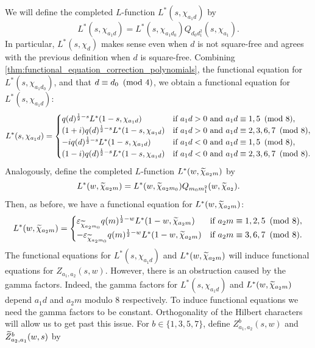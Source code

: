 \documentclass[12pt,reqno,oneside]{amsart}
\begin{document}
    We will define the completed $L$-function $L^{\ast}(s,\chi_{a_{1}d})$ by
    \[
        L^{\ast}(s,\chi_{a_{1}d}) = L^{\ast}(s,\chi_{a_{1}d_{0}})Q_{d_{0}d_{1}^{2}}(s,\chi_{a_{1}}).
    \]
    In particular, $L^{\ast}(s,\chi_{d})$ makes sense even when $d$ is not square-free and agrees with the previous definition when $d$ is square-free. 
    Combining \cref{thm:functional_equation_correction_polynomials}, the functional equation for $L^{\ast}(s,\chi_{a_{1}d_{0}})$, and that $d \equiv d_{0} \ \left(\text{mod }4\right)$, we obtain a functional equation for $L^{\ast}(s,\chi_{a_{1}d})$:
    \[
        L^{\ast}(s,\chi_{a_{1}d}) = \begin{cases} q(d)^{\frac{1}{2}-s}L^{\ast}(1-s,\chi_{a_{1}d}) & \text{if $a_{1}d > 0$ and $a_{1}d \equiv 1,5 \ \left(\text{mod }8\right)$}, \\ (1+i)q(d)^{\frac{1}{2}-s}L^{\ast}(1-s,\chi_{a_{1}d}) & \text{if $a_{1}d > 0$ and $a_{1}d \equiv 2,3,6,7 \ \left(\text{mod }8\right)$}, \\ -iq(d)^{\frac{1}{2}-s}L^{\ast}(1-s,\chi_{a_{1}d}) & \text{if $a_{1}d < 0$ and $a_{1}d \equiv 1,5 \ \left(\text{mod }8\right)$}, \\ (1-i)q(d)^{\frac{1}{2}-s}L^{\ast}(1-s,\chi_{a_{1}d}) & \text{if $a_{1}d < 0$ and $a_{1}d \equiv 2,3,6,7 \ \left(\text{mod }8\right)$}. \end{cases}
    \]
    Analogously, define the completed $L$-function $L^{\ast}(w,\widetilde{\chi}_{a_{2}m})$ by
    \[
        L^{\ast}(w,\widetilde{\chi}_{a_{2}m}) = L^{\ast}(w,\widetilde{\chi}_{a_{2}m_{0}})Q_{m_{0}m_{1}^{2}}(w,\widetilde{\chi}_{a_{2}}).
    \]
    Then, as before, we have a functional equation for $L^{\ast}(w,\widetilde{\chi}_{a_{2}m})$:
    \[
        L^{\ast}(w,\widetilde{\chi}_{a_{2}m}) = \begin{cases} \varepsilon_{\widetilde{\chi}_{a_{2}m_{0}}}q(m)^{\frac{1}{2}-w}L^{\ast}(1-w,\widetilde{\chi}_{a_{2}m}) & \text{if $a_{2}m \equiv 1,2,5 \ \left(\text{mod }8\right)$}, \\ -\varepsilon_{\widetilde{\chi}_{a_{2}m_{0}}}q(m)^{\frac{1}{2}-w}L^{\ast}(1-w,\widetilde{\chi}_{a_{2}m}) & \text{if $a_{2}m \equiv 3,6,7 \ \left(\text{mod }8\right)$}. \end{cases}
    \]
    The functional equations for $L^{\ast}(s,\chi_{a_{1}d})$ and $L^{\ast}(w,\widetilde{\chi}_{a_{2}m})$ will induce functional equations for $Z_{a_{1},a_{2}}(s,w)$. However, there is an obstruction caused by the gamma factors. Indeed, the gamma factors for $L^{\ast}(s,\chi_{a_{1}d})$ and $L^{\ast}(w,\widetilde{\chi}_{a_{2}m})$ depend $a_{1}d$ and $a_{2}m$ modulo $8$ respectively. To induce functional equations we need the gamma factors to be constant. Orthogonality of the Hilbert characters will allow us to get past this issue. For $b \in \{1,3,5,7\}$, define $Z_{a_{1},a_{2}}^{b}(s,w)$ and $\widetilde{Z}_{a_{2},a_{1}}^{b}(w,s)$ by
\end{document}
